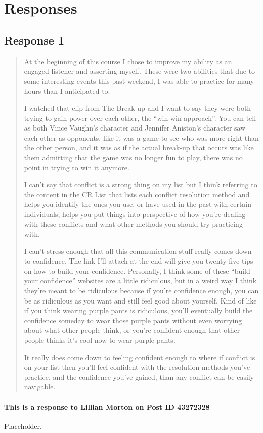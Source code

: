
\section{Responses}
  \subsection{Response 1}
    \begin{quotation}
      At the beginning of this course I chose to improve my ability as an
        engaged listener and asserting myself. These were two abilities that due
        to some interesting events this past weekend, I was able to practice for
        many hours than I anticipated to.

      I watched that clip from The Break-up and I want to say they were both
        trying to gain power over each other, the ``win-win approach''. You can
        tell as both Vince Vaughn's character and Jennifer Aniston's character
        saw each other as opponents, like it was a game to see who was more
        right than the other person, and it was as if the actual break-up that
        occurs was like them admitting that the game was no longer fun to play,
        there was no point in trying to win it anymore.

      I can't say that conflict is a strong thing on my list but I think
        referring to the content in the CR List that lists each conflict
        resolution method and helps you identify the ones you use, or have used
        in the past with certain individuals, helps you put things into
        perspective of how you're dealing with these conflicts and what other
        methods you should try practicing with.

      I can't stress enough that all this communication stuff really comes down
        to confidence. The link I'll attach at the end will give you twenty-five
        tips on how to build your confidence. Personally, I think some of these
        ``build your confidence'' websites are a little ridiculous, but in a
        weird way I think they're meant to be ridiculous because if you're
        confidence enough, you can be as ridiculous as you want and still feel
        good about yourself. Kind of like if you think wearing purple pants is
        ridiculous, you'll eventually build the confidence someday to wear those
        purple pants without even worrying about what other people think, or
        you're confident enough that other people thinks it's cool now to wear
        purple pants.

      It really does come down to feeling confident enough to where if conflict
        is on your list then you'll feel confident with the resolution methods
        you've practice, and the confidence you've gained, than any conflict can
        be easily navigable.
    \end{quotation}

    \paragraph{This is a response to Lillian Morton on Post ID 43272328}
      Placeholder.

